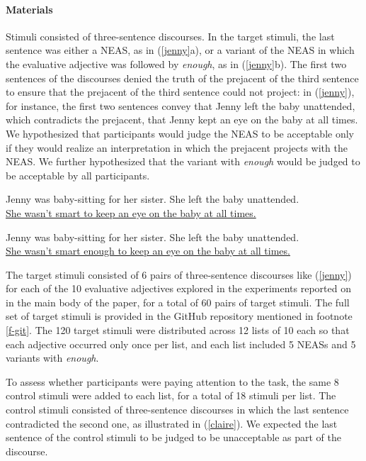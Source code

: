 \documentclass[11pt,fleqn]{article}
\newcommand{\6}{\mbox{$[\hspace*{-.6mm}[$}}
\newcommand{\9}{\mbox{$]\hspace*{-.6mm}]$}}
\begin{document}
\paragraph{Materials} Stimuli consisted of three-sentence discourses. In the target stimuli, the last sentence was either a NEAS, as in (\ref{jenny}a), or a variant of the NEAS in which the evaluative adjective was followed by {\em enough}, as in (\ref{jenny}b). The first two sentences of the discourses denied the truth of the prejacent of the third sentence to ensure that the prejacent of the third sentence could not project: in (\ref{jenny}), for instance, the first two sentences convey that Jenny left the baby unattended, which contradicts the prejacent, that Jenny kept an eye on the baby at all times. We hypothesized that participants would judge the NEAS to be acceptable only if they would realize an interpretation in which the prejacent projects with the NEAS. We further hypothesized that the variant with {\em enough} would be judged to be acceptable by all participants.

\begin{exe} 
\ex\label{jenny} 
\begin{xlist}
\ex Jenny was baby-sitting for her sister. She
left the baby unattended. \\ \underline{She wasn't smart to keep an eye on the baby at all times.} 

\ex Jenny was baby-sitting for her sister. She
left the baby unattended. \\ \underline{She wasn't smart enough to keep an eye on the baby at all times.} 

\end{xlist}
\end{exe} 

The target stimuli consisted of 6 pairs of three-sentence discourses like (\ref{jenny}) for each of the 10 evaluative adjectives explored in the experiments reported on in the main body of the paper, for a total of 60 pairs of target stimuli. The full set of target stimuli is provided in the GitHub repository mentioned in footnote \ref{f-git}. The 120 target stimuli were distributed across 12 lists of 10 each so that each adjective occurred only once per list, and each list included 5 NEASs and 5 variants with {\em enough}. 

To assess whether participants were paying attention to the task, the same 8 control stimuli were added to each list, for a total of 18 stimuli per list. The control stimuli consisted of three-sentence discourses in
which the last sentence contradicted the second one, as illustrated in
(\ref{claire}). We expected the last sentence of the control stimuli to be judged to be unacceptable as part of the discourse.
\end{document}
